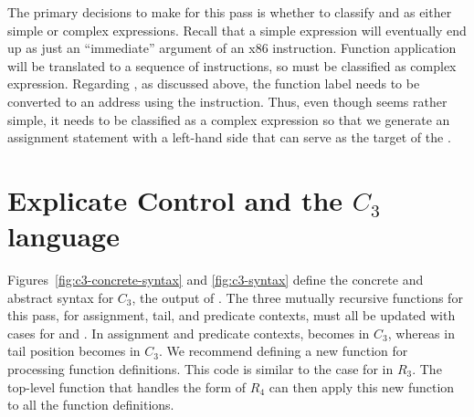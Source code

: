 \documentclass[11pt]{book}
\begin{document}
The primary decisions to make for this pass is whether to classify
 and  as either simple or complex
expressions. Recall that a simple expression will eventually end up as
just an ``immediate'' argument of an x86 instruction. Function
application will be translated to a sequence of instructions, so
 must be classified as complex expression. Regarding
, as discussed above, the function label needs to
be converted to an address using the  instruction. Thus,
even though  seems rather simple, it needs to be
classified as a complex expression so that we generate an assignment
statement with a left-hand side that can serve as the target of the
.

\section{Explicate Control and the $C_3$ language}
\label{sec:explicate-control-r4}

Figures~\ref{fig:c3-concrete-syntax} and \ref{fig:c3-syntax} define
the concrete and abstract syntax for $C_3$, the output of
. The three mutually recursive functions for
this pass, for assignment, tail, and predicate contexts, must all be
updated with cases for  and . In assignment
and predicate contexts,  becomes  in $C_3$,
whereas in tail position  becomes  in
$C_3$.  We recommend defining a new function for processing function
definitions.  This code is similar to the case for  in
$R_3$.  The top-level  function that handles
the  form of $R_4$ can then apply this new function
to all the function definitions.
\end{document}
